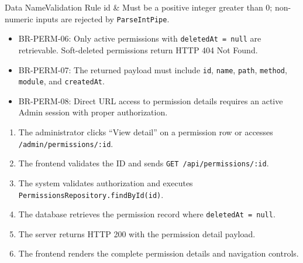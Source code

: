 \begin{specdatatable}{Data Name}{Validation Rule}
id & Must be a positive integer greater than 0; non-numeric inputs are rejected by \texttt{ParseIntPipe}.\\ \hline
\end{specdatatable}

\begin{itemize}[leftmargin=1.6em,topsep=3pt,itemsep=2pt,parsep=0pt,label=$\bullet$]\brrulelist
    \item BR-PERM-06: Only active permissions with \texttt{deletedAt = null} are retrievable. Soft-deleted permissions return HTTP 404 Not Found.
    \item BR-PERM-07: The returned payload must include \texttt{id}, \texttt{name}, \texttt{path}, \texttt{method}, \texttt{module}, and \texttt{createdAt}.
    \item BR-PERM-08: Direct URL access to permission details requires an active Admin session with proper authorization.
\end{itemize}

\begin{enumerate}[leftmargin=1.6em,topsep=3pt,itemsep=2pt,parsep=0pt]
    \item The administrator clicks ``View detail'' on a permission row or accesses \texttt{/admin/permissions/:id}.
    \item The frontend validates the ID and sends \texttt{GET /api/permissions/:id}.
    \item The system validates authorization and executes \texttt{PermissionsRepository.findById(id)}.
    \item The database retrieves the permission record where \texttt{deletedAt = null}.
    \item The server returns HTTP 200 with the permission detail payload.
    \item The frontend renders the complete permission details and navigation controls.
\end{enumerate}

